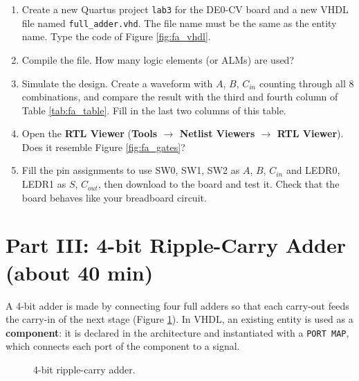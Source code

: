 \documentclass{article}
\begin{document}
\begin{enumerate}
    \item Create a new Quartus project \texttt{lab3} for the DE0-CV board and a new VHDL file named \texttt{full\_adder.vhd}. The file name must be the same as the entity name. Type the code of Figure \ref{fig:fa_vhdl}.
    \item Compile the file. How many logic elements (or ALMs) are used? \underline{\hspace{2cm}}
    \item Simulate the design. Create a waveform with $A$, $B$, $C_{in}$ counting through all 8 combinations, and compare the result with the third and fourth column of Table \ref{tab:fa_table}. Fill in the last two columns of this table.
    \item Open the \textbf{RTL Viewer} (\textbf{Tools $\rightarrow$ Netlist Viewers $\rightarrow$ RTL Viewer}). Does it resemble Figure \ref{fig:fa_gates}?
    \item Fill the pin assignments to use SW0, SW1, SW2 as $A$, $B$, $C_{in}$ and LEDR0, LEDR1 as $S$, $C_{out}$, then download to the board and test it. Check that the board behaves like your breadboard circuit.
\end{enumerate}

\section*{Part III: 4-bit Ripple-Carry Adder (about 40 min)}

A 4-bit adder is made by connecting four full adders so that each carry-out feeds the carry-in of the next stage (Figure \ref{fig:ripple}). In VHDL, an existing entity is used as a \textbf{component}: it is declared in the architecture and instantiated with a \texttt{PORT MAP}, which connects each port of the component to a signal.

\begin{figure}[H]
    \centering
    \caption{4-bit ripple-carry adder.}
    \label{fig:ripple}
\end{figure}
\end{document}
